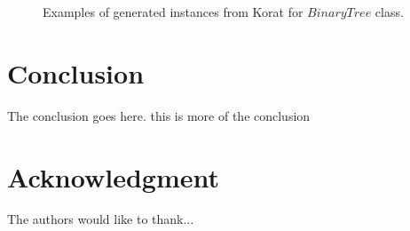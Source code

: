\documentclass[10pt, conference, compsocconf]{IEEEtran}
\begin{document}
\begin{figure}[!ht]
\centerline{
}
\caption{Examples of generated instances from Korat for $BinaryTree$ class.}
\label{fig:insts}
\end{figure}

\section{Conclusion}
The conclusion goes here. this is more of the conclusion

\section*{Acknowledgment}
The authors would like to thank...


%

\end{document}
